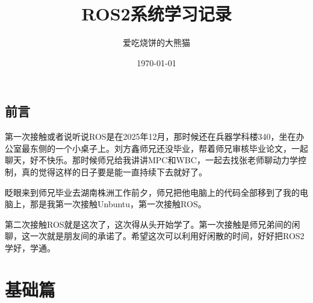 \documentclass[12pt,a4paper]{ctexbook}
\title{ROS2系统学习记录}
\author{爱吃烧饼的大熊猫}
\date{\today}
\begin{document}
\frontmatter
\maketitle

\tableofcontents

\chapter*{前言}
第一次接触或者说听说ROS是在2025年12月，那时候还在兵器学科楼340，坐在办公室最东侧的一个小桌子上。刘方鑫师兄还没毕业，帮着师兄审核毕业论文，一起聊天，好不快乐。那时候师兄给我讲讲MPC和WBC，一起去找张老师聊动力学控制，真的觉得这样的日子要是能一直持续下去就好了。

眨眼来到师兄毕业去湖南株洲工作前夕，师兄把他电脑上的代码全部移到了我的电脑上，那是我第一次接触Unbuntu，第一次接触ROS。

第二次接触ROS就是这次了，这次得从头开始学了。第一次接触是师兄弟间的闲聊，这一次就是朋友间的承诺了。希望这次可以利用好闲散的时间，好好把ROS2学好，学通。

\mainmatter

\part{基础篇}






% 
\end{document}
